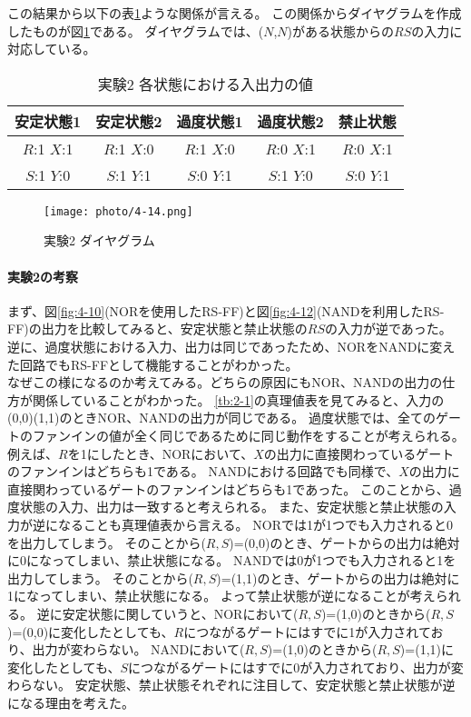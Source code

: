 \documentclass[dvipdfmx]{jsarticle}
\begin{document}
この結果から以下の表\ref{tb:4-8}ような関係が言える。
この関係からダイヤグラムを作成したものが図\ref{fig:4-14}である。
ダイヤグラムでは、($N$,$N$)がある状態からの$RS$の入力に対応している。

\begin{table}[hbtp]
  \caption{実験2 各状態における入出力の値}
  \centering
  \begin{tabular}{|c|c|c|c|c|} \hline
    安定状態1 & 安定状態2 & 過度状態1 & 過度状態2 & 禁止状態 \\ \hline
    $R$:1 $X$:1 & $R$:1 $X$:0 & $R$:1 $X$:0 & $R$:0 $X$:1 & $R$:0 $X$:1 \\
    $S$:1 $Y$:0 & $S$:1 $Y$:1 & $S$:0 $Y$:1 & $S$:1 $Y$:0 & $S$:0 $Y$:1 \\ \hline
  \end{tabular}
  \label{tb:4-8}
\end{table}

\begin{figure}
  \begin{center}
    \texttt{[image: photo/4-14.png]}
  \end{center}
  \caption{実験2 ダイヤグラム}
  \label{fig:4-14}
\end{figure}

\clearpage

\paragraph{実験2の考察}
\label{kousatu2}
まず、図\ref*{fig:4-10}(NORを使用したRS-FF)と図\ref*{fig:4-12}(NANDを利用したRS-FF)の出力を比較してみると、安定状態と禁止状態の$RS$の入力が逆であった。
逆に、過度状態における入力、出力は同じであったため、NORをNANDに変えた回路でもRS-FFとして機能することがわかった。\\

なぜこの様になるのか考えてみる。どちらの原因にもNOR、NANDの出力の仕方が関係していることがわかった。
\ref*{tb:2-1}の真理値表を見てみると、入力の(0,0)(1,1)のときNOR、NANDの出力が同じである。
過度状態では、全てのゲートのファンインの値が全く同じであるために同じ動作をすることが考えられる。
例えば、$R$を1にしたとき、NORにおいて、$X$の出力に直接関わっているゲートのファンインはどちらも1である。
NANDにおける回路でも同様で、$X$の出力に直接関わっているゲートのファンインはどちらも1であった。
このことから、過度状態の入力、出力は一致すると考えられる。
また、安定状態と禁止状態の入力が逆になることも真理値表から言える。
NORでは1が1つでも入力されると0を出力してしまう。
そのことから($R,S$)=(0,0)のとき、ゲートからの出力は絶対に0になってしまい、禁止状態になる。
NANDでは0が1つでも入力されると1を出力してしまう。
そのことから($R,S$)=(1,1)のとき、ゲートからの出力は絶対に1になってしまい、禁止状態になる。
よって禁止状態が逆になることが考えられる。
逆に安定状態に関していうと、NORにおいて($R,S$)=(1,0)のときから($R,S$)=(0,0)に変化したとしても、$R$につながるゲートにはすでに1が入力されており、出力が変わらない。
NANDにおいて($R,S$)=(1,0)のときから($R,S$)=(1,1)に変化したとしても、$S$につながるゲートにはすでに0が入力されており、出力が変わらない。
安定状態、禁止状態それぞれに注目して、安定状態と禁止状態が逆になる理由を考えた。
\end{document}
